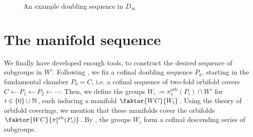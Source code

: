 \begin{figure}[ht!]
    \centering
    \qquad
    \newline
    \caption{An example doubling sequence in \(D_\infty\)}
\end{figure}

\newpage
\section{The manifold sequence}

We finally have developed enough tools, to construct the desired sequence of subgroups in \(W'\).
Following , we fix a cofinal doubling sequence \(P_k\), starting in the fundamental chamber \(P_0 = C\), i.e. a cofinal sequence of two-fold orbifold covers \(C \leftarrow P_1 \leftarrow P_2 \leftarrow \cdots\).
Then, we define the groups \(W_i := \pi_1^{\text{orb}}(P_i) \cap W'\) for \(i \in \{0\} \cup \mathbb{N}\), each inducing a manifold \(\faktor{WC}{W_i}\).
Using the theory of orbifold coverings, we mention that these manifolds cover the orbifolds \(\faktor{WC}{\pi_1^{\text{orb}}(P_i)}\).
By , the groups \(W_i\) form a cofinal descending series of subgroups.

